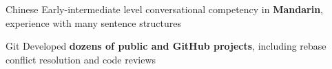 \begin{cvskills}
 




\cvskill
   {Chinese} %
   {Early-intermediate level conversational competency in \textbf{Mandarin}, experience with many sentence structures   } %

 \cvskill
    {Git} %
    {Developed \textbf{dozens of public and GitHub projects}, including rebase conflict resolution and code reviews} %


\end{cvskills}

